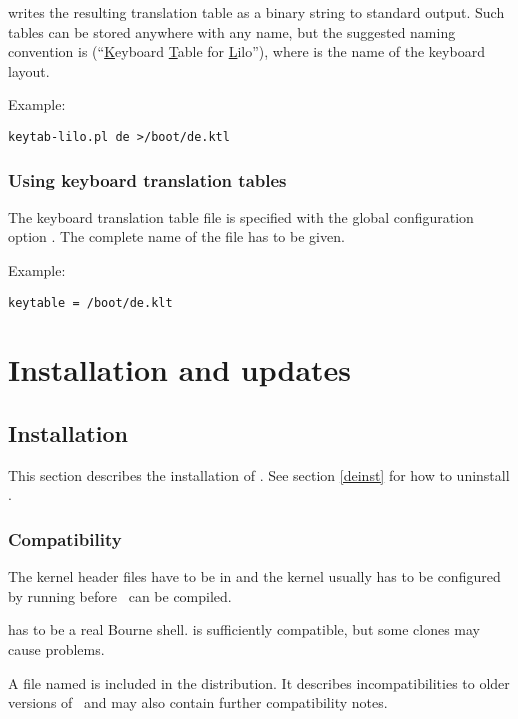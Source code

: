  writes the resulting translation table as a binary
string to standard output. Such tables can be stored anywhere with any name,
but the suggested naming convention is 
(``\underline{K}eyboard \underline{T}able for \underline{L}ilo''), where
 is the name of the keyboard layout.

Example:
\begin{verbatim}
keytab-lilo.pl de >/boot/de.ktl
\end{verbatim}


\subsubsection{Using keyboard translation tables}

The keyboard translation table file is specified with the global configuration
option . The complete name of the file has
to be given.

Example:
\begin{verbatim}
keytable = /boot/de.klt
\end{verbatim}


\newpage
\section{Installation and updates}


\subsection{Installation}

This section describes the installation of \LILO. See section \ref{deinst}
for how to uninstall \LILO.


\subsubsection{Compatibility}

The kernel header files have to be in
 and the kernel usually has to be configured by
running  before \LILO\ can be compiled.

 has to be a real Bourne shell.  is sufficiently
compatible, but some  clones may cause problems.

A file named  is included in the distribution. It describes
incompatibilities to older versions of \LILO\ and may also contain further
compatibility notes.


